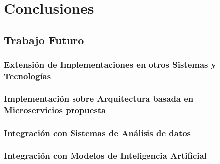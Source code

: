 \chapter{Conclusiones}

\section{Trabajo Futuro}

\subsection{Extensión de Implementaciones en otros Sistemas y Tecnologías}

\subsection{Implementación sobre Arquitectura basada en Microservicios propuesta}

\subsection{Integración con Sistemas de Análisis de datos}

\subsection{Integración con Modelos de Inteligencia Artificial}
